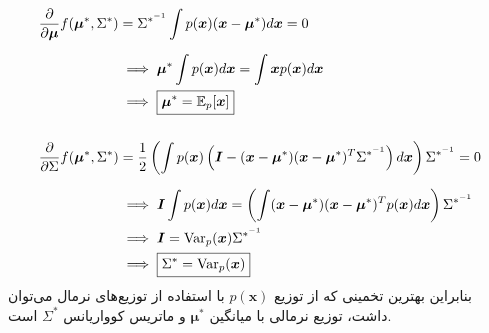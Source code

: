 \documentclass[a4paper, 12pt]{article}
\begin{document}
\[
\begin{aligned}
&\begin{aligned}
	\frac{\partial}{\partial \bm{\mu}} f(\bm{\mu}^\ast, \Sigma^\ast) &=\Sigma^{\ast^{-1}} \int p(\bm{x}) (\bm{x} - \bm{\mu}^\ast) d\bm{x} = 0 \\[0.6em]
	&\implies \bm{\mu}^\ast \int p(\bm{x}) d\bm{x} = \int \bm{x} p(\bm{x}) d\bm{x} \\
	&\implies \boxed{\bm{\mu}^\ast =  {\mathbb E}_p[\bm{x}]}
\end{aligned} \\[1.5em]
&\begin{aligned}
	\frac{\partial}{\partial \Sigma} f(\bm{\mu}^\ast, \Sigma^\ast) &=\frac{1}{2} \left(\int p(\bm{x}) \left(\bm{I} - (\bm{x} - \bm{\mu}^\ast)(\bm{x}-\bm{\mu}^\ast)^T \Sigma^{\ast^{-1}}\right) d\bm{x}\right) \Sigma^{\ast^{-1}} = 0 \\[0.6em]
	&\implies \bm{I} \int p(\bm{x}) d\bm{x} = \left(\int (\bm{x} - \bm{\mu}^\ast)(\bm{x}-\bm{\mu}^\ast)^Tp(\bm{x}) d\bm{x}\right)\Sigma^{\ast^{-1}} \\
	&\implies \bm{I} = \mathrm{Var}_p(\bm{x}) \Sigma^{\ast^{-1}} \\
	&\implies \boxed{\Sigma^\ast = \mathrm{Var}_p(\bm{x})}
\end{aligned}
\end{aligned}
\]
بنابراین بهترین تخمینی که از توزیع $p(\bm{x})$ با استفاده از توزیع‌های نرمال می‌توان داشت، توزیع نرمالی با میانگین
$\bm{\mu}^\ast$
و ماتریس کوواریانس
$\Sigma^{\ast}$
است.
\end{document}
